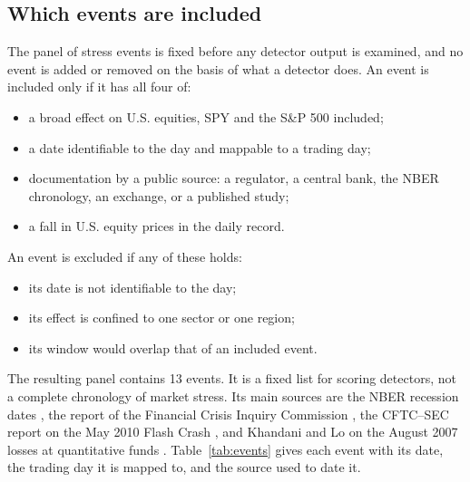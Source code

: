 \documentclass[pdflatex,sn-mathphys-num,iicol]{sn-jnl}
\begin{document}
\subsection{Which events are included}
The panel of stress events is fixed before any detector output is examined, and no event is added or removed on the basis of what a detector does. An event is included only if it has all four of:
\begin{itemize}
\item a broad effect on U.S. equities, SPY and the S\&P 500 included;
\item a date identifiable to the day and mappable to a trading day;
\item documentation by a public source: a regulator, a central bank, the NBER chronology, an exchange, or a published study;
\item a fall in U.S. equity prices in the daily record.
\end{itemize}
An event is excluded if any of these holds:
\begin{itemize}
\item its date is not identifiable to the day;
\item its effect is confined to one sector or one region;
\item its window would overlap that of an included event.
\end{itemize}
The resulting panel contains 13 events. It is a fixed list for scoring detectors, not a complete chronology of market stress. Its main sources are the NBER recession dates \cite{nber2023}, the report of the Financial Crisis Inquiry Commission \cite{fcic2011}, the CFTC--SEC report on the May 2010 Flash Crash \cite{cftcsec2010}, and Khandani and Lo on the August 2007 losses at quantitative funds \cite{khandani2007}. Table~\ref{tab:events} gives each event with its date, the trading day it is mapped to, and the source used to date it.
\end{document}
